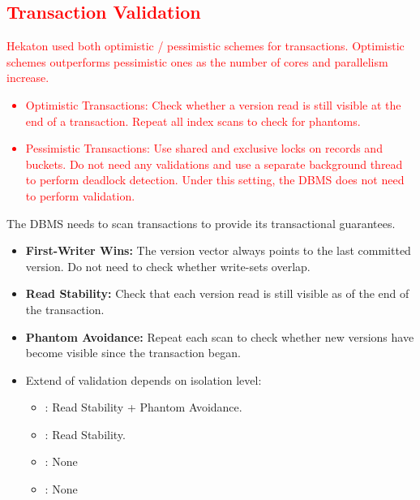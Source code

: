 \documentclass[11pt]{article}
\newcommand{\rr}[1]{\textcolor{red}{#1}}
\begin{document}
\rr{\subsection*{Transaction Validation}
Hekaton used both optimistic / pessimistic schemes for transactions. Optimistic schemes outperforms pessimistic ones as the number of cores and parallelism increase.
\begin{itemize}
    \item Optimistic Transactions: Check whether a version read is still visible at the end of a transaction. Repeat all index scans to check for phantoms. 
    \item Pessimistic Transactions: Use shared and exclusive locks on records and buckets. Do not need any validations and use a separate background thread to perform deadlock detection. Under this setting, the DBMS does not need to perform validation.
\end{itemize}}

The DBMS needs to scan transactions to provide its transactional guarantees.
\begin{itemize}
\item \textbf{First-Writer Wins:}
The version vector always points to the last committed version. Do not need to check whether write-sets overlap.

    \item \textbf{Read Stability:}
    Check that each version read is still visible as of the end of 
    the transaction.
    
    \item \textbf{Phantom Avoidance:}
    Repeat each scan to check whether new versions have become visible since the transaction began.
    
    \item Extend of validation depends on isolation level:
    \begin{itemize}
        \item {}: Read Stability + Phantom Avoidance.
        \item {}: Read Stability.
        \item {}: None
        \item {}: None
    \end{itemize}
\end{itemize}
\end{document}
